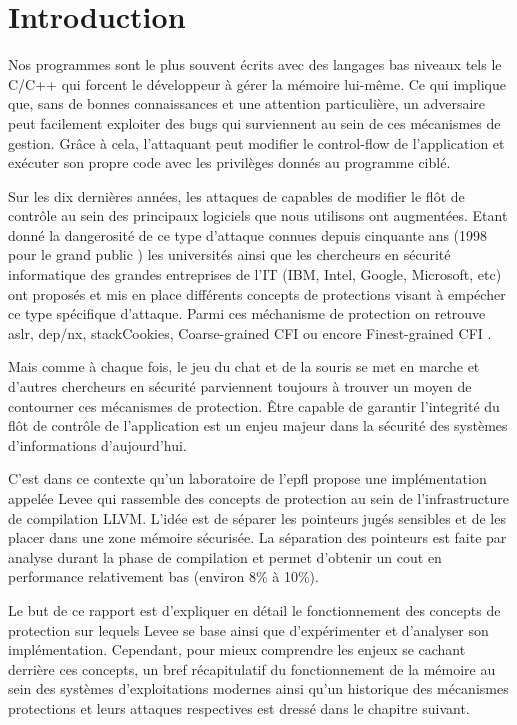 \chapter{Introduction}
\label{chap:introduction}

Nos programmes sont le plus souvent écrits avec des langages bas niveaux tels le C/C++ qui forcent le développeur à gérer la mémoire lui-même. Ce qui implique que, sans de bonnes connaissances et une attention particulière, un adversaire peut facilement exploiter des bugs qui surviennent au sein de ces mécanismes de gestion. Grâce à cela, l’attaquant peut modifier le control-flow de l'application et exécuter son propre code avec les privilèges donnés au programme ciblé.

Sur les dix dernières années, les attaques de capables de modifier le flôt de contrôle au sein des principaux logiciels que nous utilisons ont augmentées. Etant donné la dangerosité de ce type d’attaque connues depuis cinquante ans (1998 pour le \og grand public \fg) les universités ainsi que les chercheurs en sécurité informatique des grandes entreprises de l'IT (IBM, Intel, Google, Microsoft, etc) ont proposés et mis en place différents concepts de protections visant à empécher ce type spécifique d'attaque. Parmi ces méchanisme de protection on retrouve \gls{aslr}, \gls{dep}/\gls{nx},  \gls{stackCookies}, \og Coarse-grained CFI \fg ou encore \og Finest-grained CFI \fg.

Mais comme à chaque fois, le jeu du chat et de la souris se met en marche et d'autres chercheurs en sécurité parviennent toujours à trouver un moyen de contourner ces mécanismes de protection. Être capable de garantir l'integrité du flôt de contrôle de l'application est un enjeu majeur dans la sécurité des systèmes d'informations d'aujourd'hui.

C'est dans ce contexte qu'un laboratoire de l’\gls{epfl} propose une implémentation appelée Levee qui rassemble des concepts de protection au sein de l’infrastructure de compilation LLVM. L’idée est de séparer les pointeurs jugés sensibles et de les placer dans une zone mémoire sécurisée. La séparation des pointeurs est faite par analyse durant la phase de compilation et permet d’obtenir un cout en performance relativement bas (environ 8\% à 10\%).

Le but de ce rapport est d’expliquer en détail le fonctionnement des concepts de protection sur lequels Levee se base ainsi que d’expérimenter et d’analyser son implémentation. Cependant, pour mieux comprendre les enjeux se cachant derrière ces concepts, un bref récapitulatif du fonctionnement de la mémoire au sein des systèmes d'exploitations modernes ainsi qu'un historique des mécanismes protections et leurs attaques respectives est dressé dans le chapitre suivant.
